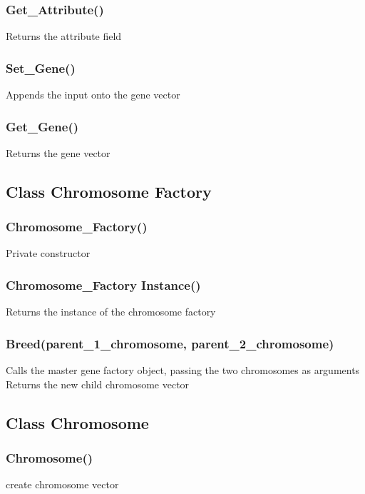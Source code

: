 \documentclass{article}
\begin{document}
\subsubsection{Get\_Attribute()}
\indent Returns the attribute field

\subsubsection{Set\_Gene()}
\indent Appends the input onto the gene vector

\subsubsection{Get\_Gene()}
\indent Returns the gene vector

\newpage

\subsection{Class Chromosome Factory}

\subsubsection{Chromosome\_Factory()}
\indent Private constructor

\subsubsection{Chromosome\_Factory Instance()}
\indent Returns the instance of the chromosome factory

\subsubsection{Breed(parent\_1\_chromosome, parent\_2\_chromosome)}
\indent Calls the master gene factory object, passing the two chromosomes as arguments\\
\indent Returns the new child chromosome vector\\

\newpage

\subsection{Class Chromosome }

\subsubsection{Chromosome()}
\indent create chromosome vector\\
\end{document}
